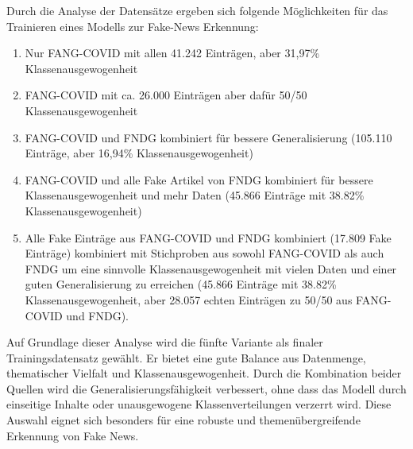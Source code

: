 Durch die Analyse der Datensätze ergeben sich folgende Möglichkeiten für das Trainieren eines Modells zur Fake-News Erkennung:
\begin{enumerate}
    \item Nur FANG-COVID mit allen 41.242 Einträgen, aber 31,97\% Klassenausgewogenheit
    \item FANG-COVID mit ca. 26.000 Einträgen aber dafür 50/50 Klassenausgewogenheit
    \item FANG-COVID und FNDG kombiniert für bessere Generalisierung (105.110 Einträge, aber 16,94\% Klassenausgewogenheit)
    \item FANG-COVID und alle Fake Artikel von FNDG kombiniert für bessere Klassenausgewogenheit und mehr Daten
    (45.866 Einträge mit 38.82\% Klassenausgewogenheit)
    \item Alle Fake Einträge aus FANG-COVID und FNDG kombiniert (17.809 Fake Einträge) kombiniert mit Stichproben aus sowohl FANG-COVID als auch FNDG
    um eine sinnvolle Klassenausgewogenheit mit vielen Daten und einer guten Generalisierung zu erreichen (45.866 Einträge mit 38.82\% Klassenausgewogenheit,
    aber 28.057 echten Einträgen zu 50/50 aus FANG-COVID und FNDG).
\end{enumerate}

Auf Grundlage dieser Analyse wird die fünfte Variante als finaler Trainingsdatensatz gewählt. 
Er bietet eine gute Balance aus Datenmenge, thematischer Vielfalt und Klassenausgewogenheit. 
Durch die Kombination beider Quellen wird die Generalisierungsfähigkeit verbessert, ohne dass das Modell durch einseitige Inhalte oder 
unausgewogene Klassenverteilungen verzerrt wird. Diese Auswahl eignet sich besonders für eine robuste und themenübergreifende Erkennung von Fake News.
